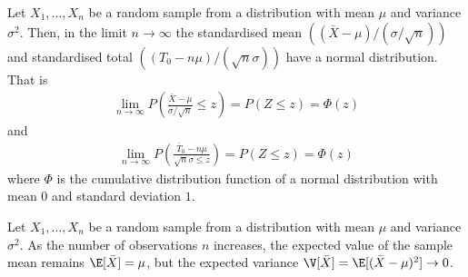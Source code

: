 \documentclass{article}
\begin{document}
\begin{theorem}
	Let $X_1,...,X_n$ be a random sample from a distribution with mean
	$\mu$ and variance $\sigma^2$. Then, in the limit $n\to\infty$ the
	standardised mean $((\bar X - \mu) / (\sigma / \sqrt{n}))$ and
	standardised total $((T_0 - n\mu)/(\sqrt{n}\sigma))$ have a normal
	distribution. That is
	\begin{align*}
		\lim_{n\to\infty}P\left(\frac{\bar X - \mu}{\sigma / \sqrt{n}}\leq z\right)
		= P(Z\leq z) = \Phi(z)
	\end{align*}
	and
	\begin{align*}
		\lim_{n\to\infty}P\left(\frac{\bar T_0-n\mu}{\sqrt{n}\sigma\leq z}\right)
		= P(Z\leq z) = \Phi(z)
	\end{align*}
	where $\Phi$ is the cumulative distribution function of a normal distribution
	with mean $0$ and standard deviation $1$.
\end{theorem}

\begin{theorem}
	Let $X_1, ..., X_n$ be a random sample from a distribution with mean
	$\mu$ and variance $\sigma^2$. As the number of observations $n$
	increases, the expected value of the sample mean remains $\E[\bar X]=\mu$,
	but the expected variance $\V[\bar X]=\E[(\bar X - \mu)^2]\to 0$.
\end{theorem}
\end{document}

